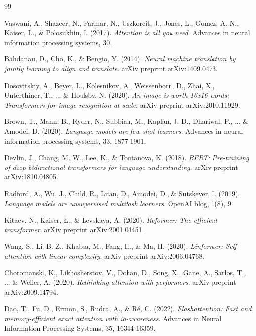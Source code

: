 
\begin{thebibliography}{99}

Vaswani, A., Shazeer, N., Parmar, N., Uszkoreit, J., Jones, L., Gomez, A. N., Kaiser, L., \& Polosukhin, I. (2017).
\textit{Attention is all you need}.
Advances in neural information processing systems, 30.

Bahdanau, D., Cho, K., \& Bengio, Y. (2014).
\textit{Neural machine translation by jointly learning to align and translate}.
arXiv preprint arXiv:1409.0473.

Dosovitskiy, A., Beyer, L., Kolesnikov, A., Weissenborn, D., Zhai, X., Unterthiner, T., ... \& Houlsby, N. (2020).
\textit{An image is worth 16x16 words: Transformers for image recognition at scale}.
arXiv preprint arXiv:2010.11929.

Brown, T., Mann, B., Ryder, N., Subbiah, M., Kaplan, J. D., Dhariwal, P., ... \& Amodei, D. (2020).
\textit{Language models are few-shot learners}.
Advances in neural information processing systems, 33, 1877-1901.

Devlin, J., Chang, M. W., Lee, K., \& Toutanova, K. (2018).
\textit{BERT: Pre-training of deep bidirectional transformers for language understanding}.
arXiv preprint arXiv:1810.04805.

Radford, A., Wu, J., Child, R., Luan, D., Amodei, D., \& Sutskever, I. (2019).
\textit{Language models are unsupervised multitask learners}.
OpenAI blog, 1(8), 9.

Kitaev, N., Kaiser, Ł., \& Levskaya, A. (2020).
\textit{Reformer: The efficient transformer}.
arXiv preprint arXiv:2001.04451.

Wang, S., Li, B. Z., Khabsa, M., Fang, H., \& Ma, H. (2020).
\textit{Linformer: Self-attention with linear complexity}.
arXiv preprint arXiv:2006.04768.

Choromanski, K., Likhosherstov, V., Dohan, D., Song, X., Gane, A., Sarlos, T., ... \& Weller, A. (2020).
\textit{Rethinking attention with performers}.
arXiv preprint arXiv:2009.14794.

Dao, T., Fu, D., Ermon, S., Rudra, A., \& Ré, C. (2022).
\textit{Flashattention: Fast and memory-efficient exact attention with io-awareness}.
Advances in Neural Information Processing Systems, 35, 16344-16359.

\end{thebibliography}

